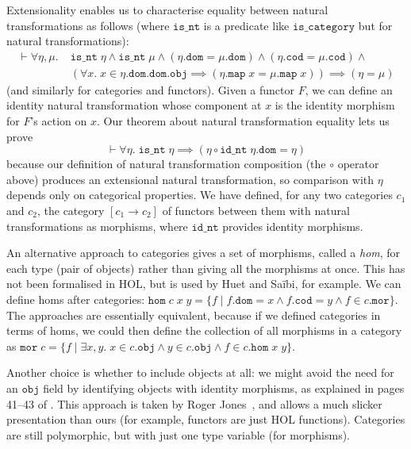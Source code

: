 \documentclass[twoside,titlepage,11pt]{article}
\begin{document}
Extensionality enables us to characterise equality between natural transformations as follows (where $\mathtt{is\_nt}$ is a predicate like $\mathtt{is\_category}$ but for natural transformations):
\begin{align*}
\vdash\forall{\eta,\mu}.\;&\mathtt{is\_nt}\;\eta\land\mathtt{is\_nt}\;\mu\land(\eta.\mathtt{dom} = \mu.\mathtt{dom})\land(\eta.\mathtt{cod} = \mu.\mathtt{cod})\land{}\\
&(\forall{x}.\;x\in \eta.\mathtt{dom}.\mathtt{dom}.\mathtt{obj}\implies(\eta.\mathtt{map}\;x= \mu.\mathtt{map}\;x))\implies (\eta = \mu)
\end{align*}
(and similarly for categories and functors).
Given a functor $F$, we can define an identity natural transformation whose component at $x$ is the identity morphism for $F$'s action on $x$.
Our theorem about natural transformation equality lets us prove
\[\vdash\forall{\eta}.\;\mathtt{is\_nt}\;\eta\implies(\eta\circ\mathtt{id\_nt}\;\eta.\mathtt{dom} = \eta)\]
because our definition of natural transformation composition (the $\circ$ operator above) produces an extensional natural transformation, so comparison with $\eta$ depends only on categorical properties.
We have defined, for any two categories $c_1$ and $c_2$, the category $[c_1\to c_2]$ of functors between them with natural transformations as morphisms, where $\mathtt{id\_nt}$ provides identity morphisms.

An alternative approach to categories gives a set of morphisms, called a \emph{hom}, for each type (pair of objects) rather than giving all the morphisms at once.
This has not been formalised in HOL, but is used by Huet and Sa{\"i}bi, for example.
We can define homs after categories: $\mathtt{hom}\;c\;x\;y=\{f\mid f.\mathtt{dom}=x\land f.\mathtt{cod}=y\land f\in c.\mathtt{mor}\}$.
The approaches are essentially equivalent, because if we defined categories in terms of homs, we could then define the collection of all morphisms in a category as $\mathtt{mor}\;c=\{f\mid\exists{x,y}.\;x\in c.\mathtt{obj}\land y\in c.\mathtt{obj}\land f\in c.\mathtt{hom}\;x\;y\}$.

Another choice is whether to include objects at all: we might avoid the need for an $\mathtt{obj}$ field by identifying objects with identity morphisms, as explained in pages 41--43 of \cite{DBLP:books/daglib/0023249}.
This approach is taken by Roger Jones~\cite{RBJones17}, and allows a much slicker presentation than ours (for example, functors are just HOL functions).
Categories are still polymorphic, but with just one type variable (for morphisms).
\end{document}
